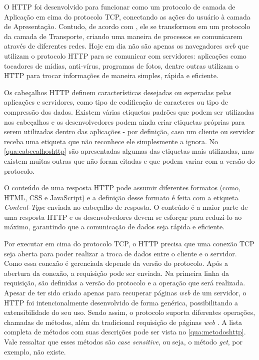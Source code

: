 O HTTP foi desenvolvido para funcionar como um protocolo de camada de Aplicação em cima do protocolo TCP, conectando as ações do usuário à camada de Apresentação. Contudo, de acordo com , ele se transformou em um protocolo da camada de Transporte, criando uma maneira de processos se comunicarem através de diferentes redes. Hoje em dia não são apenas os navegadores \textit{web} que utilizam o protocolo HTTP para se comunicar com servidores: aplicações como tocadores de mídias, anti-vírus, programas de fotos, dentre outras utilizam o HTTP para trocar informações de maneira simples, rápida e eficiente.\cite{Tanenbaum}

Os cabeçalhos HTTP definem características desejadas ou esperadas pelas aplicações e servidores, como tipo de codificação de caracteres ou tipo de compressão dos dados. Existem várias etiquetas padrões que podem ser utilizadas nos cabeçalhos e os desenvolvedores podem ainda criar etiquetas próprias para serem utilizadas dentro das aplicações - por definição, caso um cliente ou servidor receba uma etiqueta que não reconhece ele simplesmente a ignora. No \autoref{qua:cabecalhoshttp} são apresentadas algumas das etiquetas mais utilizadas, mas existem muitas outras que não foram citadas e que podem variar com a versão do protocolo.\cite{Tanenbaum}



O conteúdo de uma resposta HTTP pode assumir diferentes formatos (como, HTML, CSS e JavaScript) e a definição desse formato é feita com a etiqueta \textit{Content-Type} enviada no cabeçalho de resposta. O conteúdo é a maior parte de uma resposta HTTP e os desenvolvedores devem se esforçar para reduzi-lo ao máximo, garantindo que a comunicação de dados seja rápida e eficiente.\cite{Tanenbaum}

Por executar em cima do protocolo TCP, o HTTP precisa que uma conexão TCP seja aberta para poder realizar a troca de dados entre o cliente e o servidor. Como essa conexão é gerenciada depende da versão do protocolo. Após a abertura da conexão, a requisição pode ser enviada. Na primeira linha da requisição, são definidas a versão do protocolo e a operação que será realizada. Apesar de ter sido criado apenas para recuperar páginas \textit{web} de um servidor, o HTTP foi intencionalmente desenvolvido de forma genérica, possibilitando a extensibilidade do seu uso. Sendo assim, o protocolo suporta diferentes operações, chamadas de métodos, além da tradicional requisição de páginas \textit{web} \cite{Tanenbaum}. A lista completa de métodos com suas descrições pode ser vista no \autoref{qua:metodoshttp}. Vale ressaltar que esses métodos são \textit{case sensitive}, ou seja, o método \textit{get}, por exemplo, não existe.

